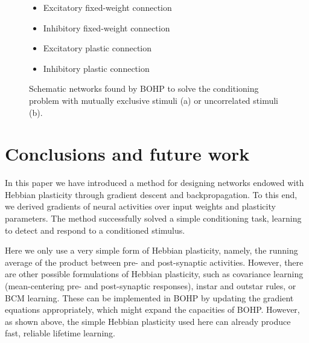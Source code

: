 \documentclass{article}
\begin{document}
\begin{figure}
\begin{subfigure}[t]{0.35\textwidth}
\end{subfigure}
\begin{minipage}[b]{0.35\textwidth}
\centering
\begin{itemize}
\item[]\tikz{\path[very thick,->,draw=black] %
        (0,0) -- (1,0) ;}Excitatory fixed-weight connection
\item[]\tikz{\path[very thick,->,draw=red] %
        (0,0) -- (1,0) ;}Inhibitory fixed-weight connection
\item[]\tikz{\path[very thick,->,dashed,draw=black] %
        (0,0) -- (1,0) ;}Excitatory plastic connection
\item[]\tikz{\path[very thick,->,dashed,draw=red] %
        (0,0) -- (1,0) ;}Inhibitory plastic connection
\end{itemize}
\end{minipage}

\caption{Schematic networks found by BOHP to solve the conditioning problem with
mutually exclusive stimuli (a) or uncorrelated stimuli (b).}
\label{fig:networks}
\end{figure}


\section{Conclusions and future work}


In this paper we have introduced a method for designing networks endowed with
Hebbian plasticity through gradient descent and backpropagation. To this end, we
derived gradients of neural activities over input weights and plasticity
parameters. The method successfully solved a simple conditioning task, learning
to detect and respond to a conditioned stimulus.

Here we only use a very simple form of Hebbian plasticity, namely, the
running average of the product between pre- and post-synaptic activities.
However, there are other possible formulations of Hebbian plasticity, such as
covariance learning (mean-centering pre- and post-synaptic responses), instar
and outstar rules, or BCM learning. These can be implemented in BOHP by updating
the gradient equations appropriately, which might expand the capacities of BOHP. However, as shown above, the simple
Hebbian plasticity used here can already produce fast, reliable lifetime
learning.
\end{document}
